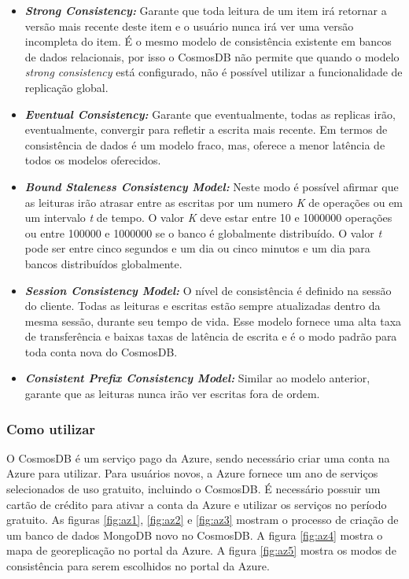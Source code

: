 \documentclass[12pt]{article}
\begin{document}
\begin{itemize}
	\item \textbf{\textit{Strong Consistency:}} Garante que toda leitura de um item irá retornar a versão mais recente deste item e o usuário nunca irá ver uma versão incompleta do item. 
	É o mesmo modelo de consistência existente em bancos de dados relacionais, por isso o CosmosDB não permite que quando o modelo \textit{strong consistency} está configurado, não é possível utilizar a funcionalidade
	de replicação global.
	\item \textbf{\textit{Eventual Consistency:}} Garante que eventualmente, todas as replicas irão, eventualmente, convergir para refletir a escrita mais recente. Em termos de consistência de dados é um modelo fraco, mas,
	oferece a menor latência de todos os modelos oferecidos. 
	\item \textbf{\textit{Bound Staleness Consistency Model:}} Neste modo é possível afirmar que as leituras irão atrasar entre as escritas por um numero \textit{K} de operações ou em um intervalo \textit{t} de tempo. O valor \textit{K} deve estar entre
	10 e 1000000 operações ou entre 100000 e 1000000 se o banco é globalmente distribuído. O valor \textit{t} pode ser entre cinco segundos e um dia ou cinco minutos e um dia para bancos distribuídos globalmente.
	\item \textbf{\textit{Session Consistency Model:}} O nível de consistência é definido na sessão do cliente. Todas as leituras e escritas estão sempre atualizadas dentro da mesma sessão, durante seu tempo de vida. Esse modelo fornece uma
	alta taxa de transferência e baixas taxas de latência de escrita e é o modo padrão para toda conta nova do CosmosDB. 
	\item \textbf{\textit{Consistent Prefix Consistency Model:}} Similar ao modelo anterior, garante que as leituras nunca irão ver escritas fora de ordem. 
\end{itemize}

\subsubsection{Como utilizar}
O CosmosDB é um serviço pago da Azure, sendo necessário criar uma conta na Azure para utilizar. Para usuários novos, a Azure fornece um ano de serviços selecionados de uso gratuito, incluindo o CosmosDB. É necessário possuir um cartão de crédito
para ativar a conta da Azure e utilizar os serviços no período gratuito. As figuras \ref{fig:az1}, \ref{fig:az2} e \ref{fig:az3} mostram o processo de criação de um banco de dados MongoDB novo no CosmosDB. A figura \ref{fig:az4} mostra o mapa de 
georeplicação no portal da Azure. A figura \ref{fig:az5} mostra os modos de consistência para serem escolhidos no portal da Azure.
\end{document}
